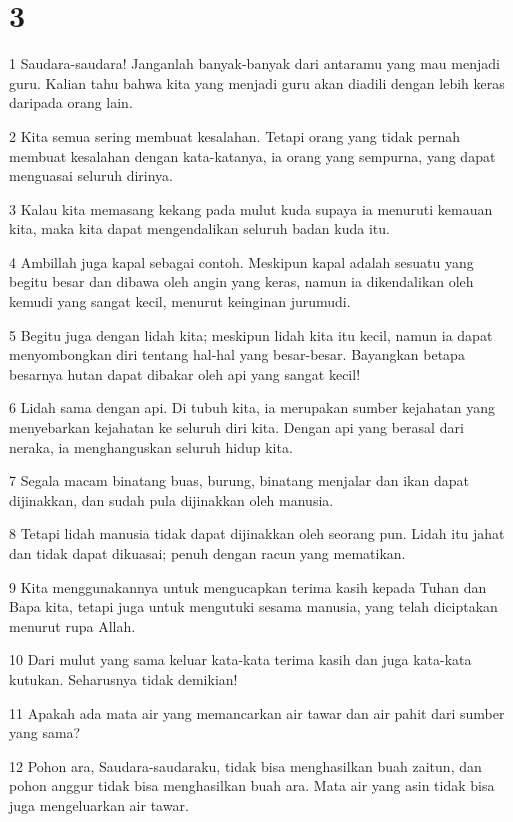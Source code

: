 \chapter{3}

\par 1 Saudara-saudara! Janganlah banyak-banyak dari antaramu yang mau menjadi guru. Kalian tahu bahwa kita yang menjadi guru akan diadili dengan lebih keras daripada orang lain.
\par 2 Kita semua sering membuat kesalahan. Tetapi orang yang tidak pernah membuat kesalahan dengan kata-katanya, ia orang yang sempurna, yang dapat menguasai seluruh dirinya.
\par 3 Kalau kita memasang kekang pada mulut kuda supaya ia menuruti kemauan kita, maka kita dapat mengendalikan seluruh badan kuda itu.
\par 4 Ambillah juga kapal sebagai contoh. Meskipun kapal adalah sesuatu yang begitu besar dan dibawa oleh angin yang keras, namun ia dikendalikan oleh kemudi yang sangat kecil, menurut keinginan jurumudi.
\par 5 Begitu juga dengan lidah kita; meskipun lidah kita itu kecil, namun ia dapat menyombongkan diri tentang hal-hal yang besar-besar. Bayangkan betapa besarnya hutan dapat dibakar oleh api yang sangat kecil!
\par 6 Lidah sama dengan api. Di tubuh kita, ia merupakan sumber kejahatan yang menyebarkan kejahatan ke seluruh diri kita. Dengan api yang berasal dari neraka, ia menghanguskan seluruh hidup kita.
\par 7 Segala macam binatang buas, burung, binatang menjalar dan ikan dapat dijinakkan, dan sudah pula dijinakkan oleh manusia.
\par 8 Tetapi lidah manusia tidak dapat dijinakkan oleh seorang pun. Lidah itu jahat dan tidak dapat dikuasai; penuh dengan racun yang mematikan.
\par 9 Kita menggunakannya untuk mengucapkan terima kasih kepada Tuhan dan Bapa kita, tetapi juga untuk mengutuki sesama manusia, yang telah diciptakan menurut rupa Allah.
\par 10 Dari mulut yang sama keluar kata-kata terima kasih dan juga kata-kata kutukan. Seharusnya tidak demikian!
\par 11 Apakah ada mata air yang memancarkan air tawar dan air pahit dari sumber yang sama?
\par 12 Pohon ara, Saudara-saudaraku, tidak bisa menghasilkan buah zaitun, dan pohon anggur tidak bisa menghasilkan buah ara. Mata air yang asin tidak bisa juga mengeluarkan air tawar.
